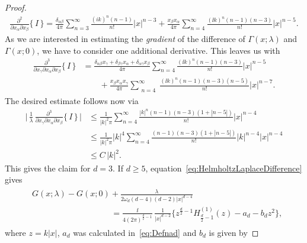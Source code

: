 \begin{proof}
\begin{align*}
    \frac{\partial^2}{\partial x_\alpha \partial x_\beta}  \big\{ \, I \, \big\}
    = \frac{\delta_{\alpha\beta}}{4 \pi} \sum_{n = 3}^\infty \frac{(ik)^n (n - 1) }{n!} |x|^{n - 3}
    + \frac{x_\beta x_\alpha}{4\pi} \sum_{n = 4}^\infty \frac{(\ii k)^n (n - 1) (n - 3)}{n!} |x|^{n - 5}.
  \end{align*}
  As we are interested in estimating the \emph{gradient} of the difference of $\Gamma(x; \lambda)$ and $\Gamma(x; 0)$, we have to consider one additional derivative. This leaves us with
\begin{align*}
  \frac{\partial^3}{\partial x_\gamma \partial x_\alpha \partial x_\beta} \big\{ \, I\, \big\}
    &= \frac{\delta_{\alpha\beta} x_\gamma + \delta_{\beta\gamma} x_\alpha + \delta_{\alpha\gamma} x_\beta}{4\pi} \sum_{n = 4}^\infty \frac{(\ii k)^n (n - 1) (n - 3)}{n!}  |x|^{n - 5} \\
    &\qquad + \frac{x_\beta x_\alpha x_\gamma}{4\pi} \sum_{\substack{n = 4}}^\infty \frac{(\ii k)^n (n - 1) (n - 3) (n - 5)}{n!} |x|^{n - 7}.
\end{align*}
The desired estimate follows now via
\begin{align*}
  \bigg|\, \frac{1}{\lambda}\, \frac{\partial^3}{\partial x_\gamma \partial x_\alpha \partial x_\beta} \big\{ \, I\, \big\}  \, \bigg|
  &\leq \frac{1}{|k|^2\pi}  \sum_{n = 4}^\infty \frac{|k|^n (n - 1) (n - 3)(1 + |n - 5|)}{n!} |x|^{n - 4} \\
  &\leq \frac{1}{|k|^2 \pi} |k|^4 \sum_{n = 4}^\infty \frac{(n - 1)(n - 3)(1 + |n - 5|)}{n!} |k|^{n - 4} |x|^{n - 4}\\
  &\leq C \, |k|^2.
\end{align*}
This gives the claim for $d = 3$.
If $d \geq 5$, equation~\eqref{eq:HelmholtzLaplaceDifference} gives
\begin{align}
  \label{eq:secondTerm}
  \begin{alignedat}{1}
    &G(x; \lambda)- G(x; 0) + \frac{\lambda}{2 \omega_d (d - 4) (d - 2) |x|^{d - 4}} \\[0.5em]
  &\hspace{4cm}= \frac{\ii}{4 (2\pi)^{\frac{d}{2} - 1}} \, \frac{1}{|x|^{d - 2}} \Big\{ z^{\frac{d}{2} - 1} H_{\frac{d}{2} - 1}^{(1)}(z) - a_d - b_d z^2\Big\},
  \end{alignedat}
\end{align}
where $z = k|x|$, $a_d$ was calculated in~\eqref{eq:Defnad} and $b_d$ is given by

\end{proof}
